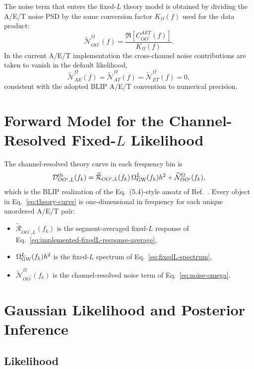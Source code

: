 \documentclass[11pt]{article}
\newcommand{\OmL}{\Omega_{\rm GW}^{L}}
\newcommand{\Rsp}{\widetilde{\mathcal{R}}}
\newcommand{\Ntil}{\widetilde{\mathcal{N}}}
\newcommand{\Dth}{\mathcal{D}^{\rm th}}
\newcommand{\OO}{OO^\prime}
\begin{document}
The noise term that enters the fixed-$L$ theory model is obtained by dividing the A/E/T noise PSD by the same conversion factor $K_{\Omega}(f)$ used for the data product:
\begin{equation}
  \Ntil^\Omega_{\OO}(f)
  =
  \frac{\Re[C^{AET}_{\OO}(f)]}{K_{\Omega}(f)}.
  \label{eq:noise-omega}
\end{equation}
In the current A/E/T implementation the cross-channel noise contributions are taken to vanish in the default likelihood,
\begin{equation}
  \Ntil^\Omega_{AE}(f) = \Ntil^\Omega_{AT}(f) = \Ntil^\Omega_{ET}(f) = 0,
\end{equation}
consistent with the adopted BLIP A/E/T convention to numerical precision.

\section{Forward Model for the Channel-Resolved Fixed-$L$ Likelihood}

The channel-resolved theory curve in each frequency bin is
\begin{equation}
  \Dth_{\OO,L}(f_k)
  =
  \Rsp_{\OO,L}(f_k)\,\OmL(f_k)h^2
  +
  \Ntil^\Omega_{\OO}(f_k),
  \label{eq:theory-curve}
\end{equation}
which is the BLIP realization of the Eq.~(5.4)-style ansatz of Ref.~\cite{LISAAnisotropyPaper}.  Every object in Eq.~\eqref{eq:theory-curve} is one-dimensional in frequency for each unique unordered A/E/T pair:
\begin{itemize}[leftmargin=2em]
  \item $\Rsp_{\OO,L}(f_k)$ is the segment-averaged fixed-$L$ response of Eq.~\eqref{eq:implemented-fixedL-response-average},
  \item $\OmL(f_k)h^2$ is the fixed-$L$ spectrum of Eq.~\eqref{eq:fixedL-spectrum},
  \item $\Ntil^\Omega_{\OO}(f_k)$ is the channel-resolved noise term of Eq.~\eqref{eq:noise-omega}.
\end{itemize}

\section{Gaussian Likelihood and Posterior Inference}

\subsection{Likelihood}
\end{document}

